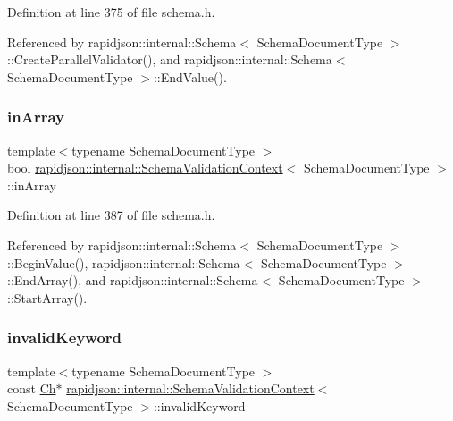 Definition at line 375 of file schema.\+h.



Referenced by rapidjson\+::internal\+::\+Schema$<$ Schema\+Document\+Type $>$\+::\+Create\+Parallel\+Validator(), and rapidjson\+::internal\+::\+Schema$<$ Schema\+Document\+Type $>$\+::\+End\+Value().

\mbox{\label{structrapidjson_1_1internal_1_1_schema_validation_context_a8b4cf20c9cdc97355640dbccee95f3e1}} 
\subsubsection{\texorpdfstring{inArray}{inArray}}
{\footnotesize\ttfamily template$<$typename Schema\+Document\+Type $>$ \\
bool \mbox{\hyperlink{structrapidjson_1_1internal_1_1_schema_validation_context}{rapidjson\+::internal\+::\+Schema\+Validation\+Context}}$<$ Schema\+Document\+Type $>$\+::in\+Array}



Definition at line 387 of file schema.\+h.



Referenced by rapidjson\+::internal\+::\+Schema$<$ Schema\+Document\+Type $>$\+::\+Begin\+Value(), rapidjson\+::internal\+::\+Schema$<$ Schema\+Document\+Type $>$\+::\+End\+Array(), and rapidjson\+::internal\+::\+Schema$<$ Schema\+Document\+Type $>$\+::\+Start\+Array().

\mbox{\label{structrapidjson_1_1internal_1_1_schema_validation_context_a42b7f2d6a85cb43b3cdeac057a4279be}} 
\subsubsection{\texorpdfstring{invalidKeyword}{invalidKeyword}}
{\footnotesize\ttfamily template$<$typename Schema\+Document\+Type $>$ \\
const \mbox{\hyperlink{structrapidjson_1_1internal_1_1_schema_validation_context_aeb3b15fcfda759e506a5da83c6f782ca}{Ch}}$\ast$ \mbox{\hyperlink{structrapidjson_1_1internal_1_1_schema_validation_context}{rapidjson\+::internal\+::\+Schema\+Validation\+Context}}$<$ Schema\+Document\+Type $>$\+::invalid\+Keyword}



